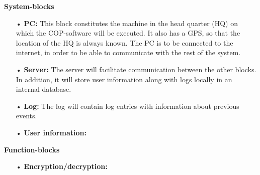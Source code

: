\textbf{System-blocks}
\begin{enumerate}
\item[•] \textbf{PC:} This block constitutes the machine in the head quarter (HQ) on which the COP-software will be executed. It also has a GPS, so that the location of the HQ is always known. The PC is to be connected to the internet, in order to be able to communicate with the rest of the system.
\item[•] \textbf{Server:} The server will facilitate communication between the other blocks. In addition, it will store user information along with logs locally in an internal database.
\item[•] \textbf{Log:} The log will contain log entries with information about previous events.
\item[•] \textbf{User information:} 
\end{enumerate}

\textbf{Function-blocks}
\begin{enumerate}
\item[•] \textbf{Encryption/decryption:} 
\end{enumerate}